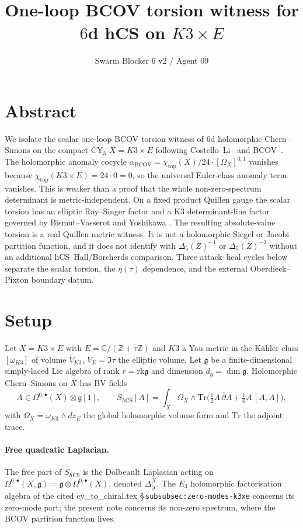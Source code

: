 \documentclass[11pt]{article}
\title{One-loop BCOV torsion witness for $6$d hCS on $K3\times E$}
\author{Swarm Blocker $6$ v$2$ / Agent $09$}
\date{}
\theoremstyle{definition}
\providecommand{\C}{\mathbb{C}}
\providecommand{\Z}{\mathbb{Z}}
\providecommand{\frakg}{\mathfrak{g}}
\providecommand{\dbar}{\bar{\partial}}
\renewcommand{\Dbar}{\Delta_{\bar{\partial}}}
\providecommand{\hCS}{h\mathrm{CS}}
\providecommand{\BCOV}{\mathrm{BCOV}}
\providecommand{\Tr}{\mathrm{Tr}}
\providecommand{\rk}{\mathrm{rk}}
\begin{document}
\maketitle

\section*{Abstract}

We isolate the scalar one-loop BCOV torsion witness of $6$d holomorphic
Chern--Simons on the compact CY$_3$ $X = K3\times E$ following
Costello--Li~\cite{CL1201.4501} and BCOV~\cite{BCOV1993,BCOV1994}. The
holomorphic anomaly cocycle $\alpha_{\BCOV} = \chi_{\mathrm{top}}(X)/24
\cdot [\Omega_X]^{0,1}$ vanishes because $\chi_{\mathrm{top}}(K3\times E) =
24\cdot 0 = 0$, so the universal Euler-class anomaly term vanishes.
This is weaker than a proof that the whole non-zero-spectrum determinant
is metric-independent. On a fixed product Quillen gauge the scalar
torsion has an elliptic Ray--Singer factor and a K3 determinant-line
factor governed by Bismut--Vasserot and Yoshikawa
\cite{Bismut1986,BismutVasserot1989,Yoshikawa2004}. The resulting
absolute-value torsion is a real Quillen metric witness. It is not a
holomorphic Siegel or Jacobi partition function, and it does not identify
with $\Delta_5(Z)^{-1}$ or $\Delta_5(Z)^{-2}$ without an additional
hCS--Hall/Borcherds comparison. Three attack--heal cycles below separate
the scalar torsion, the $\eta(\tau)$ dependence, and the external
Oberdieck--Pixton boundary datum.

\tableofcontents

\section{Setup}
\label{sec:setup}

Let $X = K3\times E$ with $E = \C/(\Z + \tau\Z)$ and $K3$ a Yau metric in
the K\"ahler class $[\omega_{K3}]$ of volume $V_{K3}$, $V_E = \Im\tau$
the elliptic volume. Let $\frakg$ be a finite-dimensional simply-laced
Lie algebra of rank $r = \rk\frakg$ and dimension $d_\frakg = \dim\frakg$.
Holomorphic Chern--Simons on $X$ has BV fields
\[
A \in \Omega^{0,\bullet}(X)\otimes\frakg[1],
\qquad
S_{\hCS}[A] = \int_X \Omega_X\wedge \Tr\!\Big(\tfrac{1}{2}A\,\dbar A
+ \tfrac{1}{6}A\,[A,A]\Big),
\]
with $\Omega_X = \omega_{K3}\wedge dz_E$ the global holomorphic volume form
and $\Tr$ the adjoint trace.

\paragraph{Free quadratic Laplacian.} The free part of $S_{\hCS}$ is the
Dolbeault Laplacian acting on $\Omega^{0,\bullet}(X,\frakg) =
\frakg\otimes\Omega^{0,\bullet}(X)$, denoted $\Dbar^X$. The $E_3$
holomorphic factorisation algebra of the cited cy\_to\_chiral.tex
\S\,\texttt{subsubsec:zero-modes-k3xe} concerns its zero-mode part; the
present note concerns its non-zero spectrum, where the BCOV partition
function lives.
\end{document}
